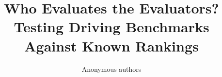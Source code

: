 \documentclass[10pt,twocolumn,letterpaper]{article}
\title{Who Evaluates the Evaluators?\\Testing Driving Benchmarks Against Known Rankings}
\author{Anonymous authors}
\begin{document}
\maketitle







{
    \small
    
    
}
\end{document}
